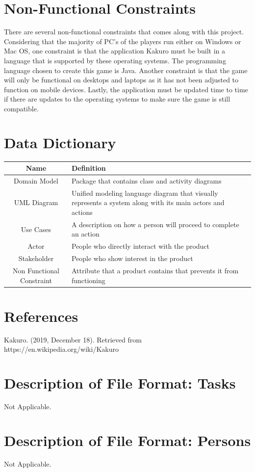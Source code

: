 \documentclass[12pt]{article}
\begin{document}
\section{Non-Functional Constraints}
There are several non-functional constraints that comes along with this project. Considering that the majority of PC’s of the players run either on Windows or Mac OS, one constraint is that the application Kakuro must be built in a language that is supported by these operating systems. The programming language chosen to create this game is Java. Another constraint is that the game will only be functional on desktops and laptops as it has not been adjusted to function on mobile devices. Lastly, the application must be updated time to time if there are updates to the operating systems to make sure the game is still compatible.\\

\newpage
\pagestyle{plain} 
\section{Data Dictionary}

\begin{table}[htbp]
\begin{tabular}{|c | m{10cm}|}
\hline
\cellcolor{gray}Name & \cellcolor{gray}Definition \\
\hline
Domain Model & Package that contains class and activity diagrams  \\
\hline
UML Diagram & Unified modeling language diagram that visually represents a system along with its main actors and actions \\
\hline
Use Cases & A description on how a person will proceed to complete an action \\
\hline
Actor & People who directly interact with the product \\
\hline
Stakeholder & People who show interest in the product\\
\hline
Non Functional Constraint & Attribute that a product contains that prevents it from functioning\\
\hline

\end{tabular}

\end{table}

\newpage
\pagestyle{plain} 
\section{References}

Kakuro. (2019, December 18). Retrieved from https://en.wikipedia.org/wiki/Kakuro
\newpage
\pagestyle{plain} 
\appendix

\section{Description of File Format: Tasks}

Not Applicable.

\section{Description of File Format: Persons}

Not Applicable.
\end{document}
